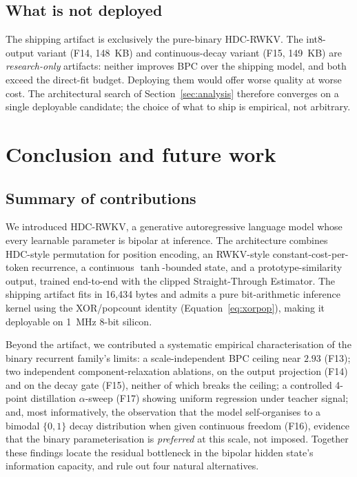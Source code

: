 \documentclass[runningheads]{llncs}
\begin{document}
\subsection{What is not deployed}

The shipping artifact is exclusively the pure-binary HDC-RWKV.
The int8-output variant (F14, 148~KB) and continuous-decay variant
(F15, 149~KB) are \emph{research-only} artifacts: neither
improves BPC over the shipping model, and both exceed the direct-fit budget.
Deploying them would offer worse quality at worse cost. The
architectural search of Section~\ref{sec:analysis} therefore
converges on a single deployable candidate; the choice of what to
ship is empirical, not arbitrary.


\section{Conclusion and future work}
\label{sec:conclusion}

\subsection{Summary of contributions}

We introduced HDC-RWKV, a generative autoregressive language model
whose every learnable parameter is bipolar at inference. The
architecture combines HDC-style permutation for position encoding,
an RWKV-style constant-cost-per-token recurrence, a continuous
$\tanh$-bounded state, and a prototype-similarity output, trained
end-to-end with the clipped Straight-Through Estimator. The shipping
artifact fits in 16{,}434 bytes and admits a pure bit-arithmetic
inference kernel using the XOR/popcount identity
(Equation~\ref{eq:xorpop}), making it deployable on 1~MHz 8-bit
silicon.

Beyond the artifact, we contributed a systematic empirical
characterisation of the binary recurrent family's limits: a
scale-independent BPC ceiling near $2.93$ (F13); two independent
component-relaxation ablations, on the output projection (F14) and
on the decay gate (F15), neither of which breaks the ceiling; a
controlled 4-point distillation $\alpha$-sweep (F17) showing
uniform regression under teacher signal; and, most informatively,
the observation that the model self-organises to a bimodal
$\{0,1\}$ decay distribution when given continuous freedom (F16),
evidence that the binary parameterisation is \emph{preferred} at
this scale, not imposed. Together these findings locate the
residual bottleneck in the bipolar hidden state's information
capacity, and rule out four natural alternatives.
\end{document}
